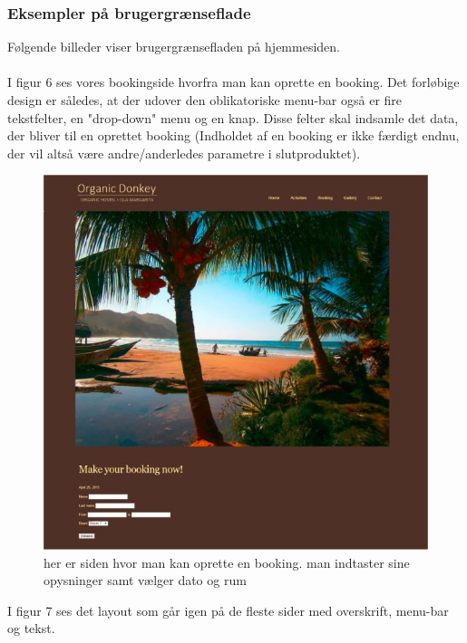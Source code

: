 \documentclass[12pt,a4paper]{article}
\begin{document}
\subsubsection{Eksempler på brugergrænseflade}
Følgende billeder viser brugergrænsefladen på hjemmesiden.\\\\
I figur 6 ses vores bookingside hvorfra man kan oprette en booking. 
Det forløbige design er således, at der udover den oblikatoriske menu-bar 
også er fire tekstfelter, en "drop-down" menu og en knap.
Disse felter skal indsamle det data, der bliver til en oprettet booking 
(Indholdet af en booking er ikke færdigt endnu, 
der vil altså være andre/anderledes parametre i slutproduktet). 
\begin{figure}[H]
\centering
\includegraphics[scale=0.9] {brugergransefladebilled1.jpg}
\caption{her er siden hvor man kan oprette en booking. man indtaster sine opysninger samt vælger dato og rum}
\end{figure}
\newpage
I figur 7 ses det layout som går igen på de fleste sider
 med overskrift, menu-bar og tekst.
\end{document}

